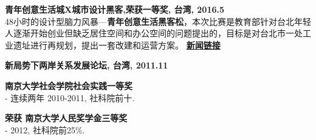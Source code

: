 \begin{cventries}
  \cventry
    {}
    {}
    {}
    {}
    {
      \begin{cvitems}
        \item {\textbf{青年创意生活城X城市设计黑客,荣获一等奖, 台湾, 2016.5} \\ %
        48小时的设计型脑力风暴—\textbf{青年创意生活黑客松}，本次比赛是教育部针对台北年轻人逐渐开始创业但缺乏居住空间和办公空间的问题提出的，目标是对台北市一处工业遗址进行再规划，提出一套改建和运营方案。%
        \href{https:www.bp.ntu.edu.tw/?p=3647}{\textbf{新闻链接}} 
        }
        \item {\textbf{新局势下两岸关系发展论坛, 台湾, 2011.11}}
        \item {\textbf{南京大学社会学院社会实践一等奖} \\ 
        - 连续两年 2010-2011, 社科院前十.
        }
        \item {\textbf{荣获 南京大学人民奖学金三等奖 } \\ 
        - 2012, 社科院前25\%.}
      \end{cvitems}
    }
\end{cventries}
